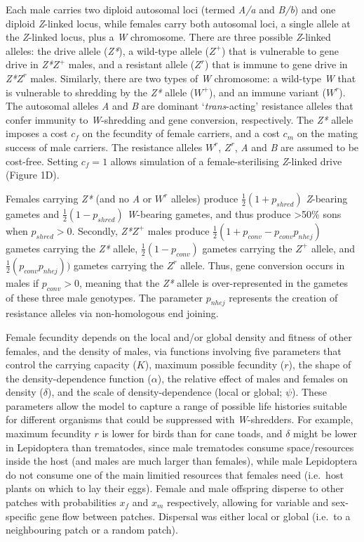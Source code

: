 \documentclass[]{rsos}%
\begin{document}
Each male carries two diploid autosomal loci (termed \emph{A/a} and
\emph{B/b}) and one diploid \emph{Z}-linked locus, while females carry
both autosomal loci, a single allele at the \emph{Z}-linked locus, plus
a \emph{W} chromosome. There are three possible \emph{Z}-linked alleles:
the drive allele (\emph{Z*}), a wild-type allele (\(Z^+\)) that is
vulnerable to gene drive in \emph{Z*}\(Z^+\) males, and a resistant
allele (\(Z^r\)) that is immune to gene drive in \emph{Z*}\(Z^r\) males.
Similarly, there are two types of \emph{W} chromosome: a wild-type
\emph{W} that is vulnerable to shredding by the \emph{Z*} allele
(\(W^+\)), and an immune variant (\(W^r\)). The autosomal alleles
\emph{A} and \emph{B} are dominant `\emph{trans}-acting' resistance
alleles that confer immunity to \emph{W}-shredding and gene conversion,
respectively. The \emph{Z*} allele imposes a cost \(c_f\) on the
fecundity of female carriers, and a cost \(c_m\) on the mating success
of male carriers. The resistance alleles \(W^r\), \(Z^r\), \emph{A} and
\emph{B} are assumed to be cost-free. Setting \(c_f = 1\) allows
simulation of a female-sterilising \emph{Z}-linked drive (Figure 1D).

Females carrying \emph{Z*} (and no \emph{A} or \(W^r\) alleles) produce
\(\frac{1}{2}(1 + p_{shred})\) \emph{Z}-bearing gametes and
\(\frac{1}{2}(1 - p_{shred})\) \emph{W}-bearing gametes, and thus
produce \textgreater{}50\% sons when \(p_{shred} > 0\). Secondly,
\emph{Z*}\(Z^+\) males produce
\(\frac{1}{2}(1 + p_{conv} - p_{conv} p_{nhej})\) gametes carrying the
\emph{Z*} allele, \(\frac{1}{2}(1 - p_{conv})\) gametes carrying the
\(Z^+\) allele, and \(\frac{1}{2}(p_{conv} p_{nhej}))\) gametes carrying
the \(Z^r\) allele. Thus, gene conversion occurs in males if
\(p_{conv} > 0\), meaning that the \emph{Z*} allele is over-represented
in the gametes of these three male genotypes. The parameter \(p_{nhej}\)
represents the creation of resistance alleles via non-homologous end
joining.

Female fecundity depends on the local and/or global density and fitness
of other females, and the density of males, via functions involving five
parameters that control the carrying capacity (\(K\)), maximum possible
fecundity (\(r\)), the shape of the density-dependence function
(\(\alpha\)), the relative effect of males and females on density
(\(\delta\)), and the scale of density-dependence (local or global;
\(\psi\)). These parameters allow the model to capture a range of
possible life histories suitable for different organisms that could be
suppressed with \emph{W}-shredders. For example, maximum fecundity \(r\)
is lower for birds than for cane toads, and \(\delta\) might be lower in
Lepidoptera than trematodes, since male trematodes consume
space/resources inside the host (and males are much larger than
females), while male Lepidoptera do not consume one of the main limitied
resources that females need (i.e.~host plants on which to lay their
eggs). Female and male offspring disperse to other patches with
probabilities \(x_f\) and \(x_m\) respectively, allowing for variable
and sex-specific gene flow between patches. Dispersal was either local
or global (i.e.~to a neighbouring patch or a random patch).
\end{document}
